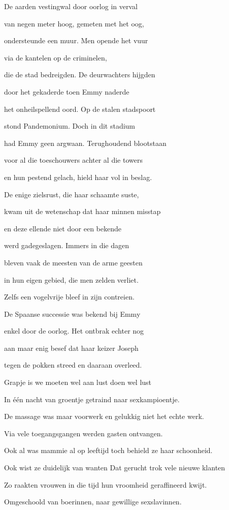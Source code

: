 De aarden vestingwal
door oorlog in verval

van negen meter hoog,
gemeten met het oog,

ondersteunde een muur.
Men opende het vuur

via de kantelen
op de criminelen,

die de stad bedreigden.
De deurwachters hijgden

door het gekaderde
toen Emmy naderde

het onheilspellend oord.
Op de stalen stadspoort

stond Pandemonium.
Doch in dit stadium

had Emmy geen argwaan. Terughoudend blootstaan

voor al die toeschouwers achter al die towers

en hun pestend gelach,
hield haar vol in beslag.

De enige zielsrust,
die haar schaamte suste,

kwam uit de wetenschap
dat haar minnen misstap

en deze ellende
niet door een bekende

werd gadegeslagen.
Immers in die dagen

bleven vaak de meesten
van de arme geesten

in hun eigen gebied,
die men zelden verliet.

Zelfs een vogelvrije
bleef in zijn contreien.

De Spaanse successie
was bekend bij Emmy

enkel door de oorlog.
Het ontbrak echter nog

aan maar enig besef
dat haar keizer Joseph

tegen de pokken streed
en daaraan overleed.

Grapje is we moeten wel aan lust doen wel lust

In één nacht van groentje
getraind naar sexkampioentje.

De massage was maar voorwerk
en gelukkig niet het echte werk.

Via vele toegangsgangen
werden gasten ontvangen.

Ook al was mammie al op leeftijd
toch behield ze haar schoonheid.

Ook wist ze duidelijk van wanten
Dat gerucht trok vele nieuwe klanten

Zo raakten vrouwen in die tijd
hun vroomheid geraffineerd kwijt.

Omgeschoold van boerinnen,
naar gewillige sexslavinnen.

